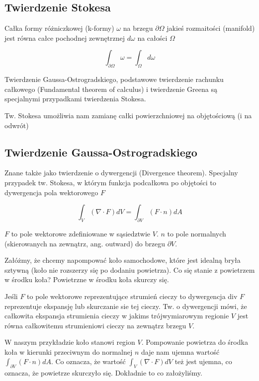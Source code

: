 \documentclass[12pt]{article}
\begin{document}
\subsection{Twierdzenie Stokesa}
Całka formy różniczkowej (k-formy) $\omega$ na brzegu $\partial \Omega$ jakieś rozmaitości (manifold) jest równa całce pochodnej zewnętrznej $d \omega$ na całości $\Omega$

\begin{equation}
\int_{\partial \Omega} \omega = \int_{\Omega} d \omega
\end{equation}

Twierdzenie Gaussa-Ostrogradskiego, podstawowe twierdzenie rachunku całkowego (Fundamental theorem of calculus) i twierdzenie Greena są specjalnymi przypadkami twierdzenia Stokesa.

Tw. Stokesa umożliwia nam zamianę całki powierzchniowej na objętościową (i na odwrót)

\subsection{Twierdzenie Gaussa-Ostrogradskiego}

Znane także jako twierdzenie o dywergencji (Divergence theorem).
Specjalny przypadek tw. Stokesa, w którym funkcja podcałkowa po objętości to dywergencja pola wektorowego $F$

\begin{equation}
\int_{V} (\nabla \cdot F) dV = \int_{\partial V} (F \cdot n) dA
\end{equation}

$F$ to pole wektorowe zdefiniowane w sąsiedztwie $V$. $n$ to pole normalnych (skierowanych na zewnątrz, ang. outward) do brzegu $\partial V$.

Załóżmy, że chcemy napompować koło samochodowe, które jest idealną bryła sztywną (koło nie rozszerzy się po dodaniu powietrza). Co się stanie z powietrzem w środku koła? Powietrzne w środku koła skurczy się.

Jeśli $F$ to pole wektorowe reprezentujące strumień cieczy to dywergencja div $F$ reprezentuje ekspansję lub skurczanie sie tej cieczy. Tw. o dywergencji mówi, że całkowita ekspansja strumienia cieczy w jakims trójwymiarowym regionie $V$ jest równa całkowitemu strumieniowi cieczy na zewnątrz brzegu $V$.

W naszym przykładzie koło stanowi region $V$. Pompowanie powietrza do środka koła w kierunki przeciwnym do normalnej $n$ daje nam ujemna wartość $\int_{\partial V} (F \cdot n) dA$. Co oznacza, że wartość $\int_{V} (\nabla \cdot F) dV$ też jest ujemna, co oznacza, że powietrze skurczyło się. Dokładnie to co założyliśmy.
\end{document}

